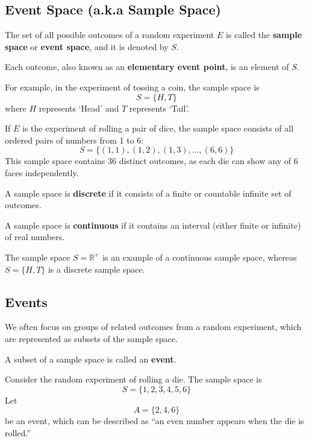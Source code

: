 \documentclass[twoside]{book}
\begin{document}
\subsection{Event Space (a.k.a Sample Space)}

\begin{textbox}
    The set of all possible outcomes of a random experiment $E$ is called the \textbf{sample space} or \textbf{event space}, and it is denoted by $S$.
\end{textbox}

Each outcome, also known as an \textbf{elementary event point}, is an element of $S$.

For example, in the experiment of tossing a coin, the sample space is
\[
S = \{H, T\}
\]
where $H$ represents `Head’ and $T$ represents `Tail’.

If $E$ is the experiment of rolling a pair of dice, the sample space consists of all ordered pairs of numbers from 1 to 6:
\[
S = \{(1,1), (1,2), (1,3), \dots, (6,6)\}
\]
This sample space contains 36 distinct outcomes, as each die can show any of 6 faces independently.

\begin{textbox}
A sample space is \textbf{discrete} if it consists of a ﬁnite or countable inﬁnite set of outcomes.

A sample space is \textbf{continuous} if it contains an interval (either ﬁnite or inﬁnite) of real
numbers.
\end{textbox}
The sample space $S = \mathbb{R}^+$ is an example of a continuous sample space, whereas $S = \{H, T\}$ is a discrete sample space.

\subsection{Events}
We often focus on groups of related outcomes from a random experiment, which are represented as subsets of the sample space.
\begin{textbox}
    A subset of a sample space is called an \textbf{event}.
\end{textbox}

Consider the random experiment of rolling a die. The sample space is
\[
S = \{1, 2, 3, 4, 5, 6\}
\]
Let
\[
A = \{2, 4, 6\}
\]
be an event, which can be described as ``an even number appears when the die is rolled.''
\end{document}
